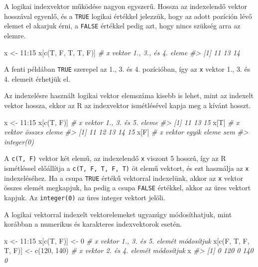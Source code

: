 \documentclass[
]{book}
\newenvironment{Shaded}{\begin{snugshade}}{\end{snugshade}}
\newcommand{\CommentTok}[1]{\textcolor[rgb]{0.56,0.35,0.01}{\textit{#1}}}
\newcommand{\DecValTok}[1]{\textcolor[rgb]{0.00,0.00,0.81}{#1}}
\newcommand{\FunctionTok}[1]{\textcolor[rgb]{0.00,0.00,0.00}{#1}}
\newcommand{\NormalTok}[1]{#1}
\newcommand{\OtherTok}[1]{\textcolor[rgb]{0.56,0.35,0.01}{#1}}
\newcommand{\SpecialCharTok}[1]{\textcolor[rgb]{0.00,0.00,0.00}{#1}}
\begin{document}
A logikai indexvektor működése nagyon egyszerű. Hossza az indexelendő vektor hosszával egyenlő, és a \texttt{TRUE} logikai értékkel jelezzük, hogy az adott pozíción lévő elemet el akarjuk érni, a \texttt{FALSE} értékkel pedig azt, hogy nincs szükség arra az elemre.

\begin{Shaded}
\begin{Highlighting}[]
\NormalTok{x }\OtherTok{\textless{}{-}} \DecValTok{11}\SpecialCharTok{:}\DecValTok{15}
\NormalTok{x[}\FunctionTok{c}\NormalTok{(T, F, T, T, F)]    }\CommentTok{\# x vektor 1., 3., és 4. eleme    }
\CommentTok{\#\textgreater{} [1] 11 13 14}
\end{Highlighting}
\end{Shaded}

A fenti példában \texttt{TRUE} szerepel az 1., 3. és 4. pozícióban, így az \texttt{x} vektor 1., 3. és 4. elemeit érhetjük el.

Az indexelésre használt logikai vektor elemszáma kisebb is lehet, mint az indexelt vektor hossza, ekkor az R az indexvektor ismétlésével kapja meg a kívánt hosszt.

\begin{Shaded}
\begin{Highlighting}[]
\NormalTok{x }\OtherTok{\textless{}{-}} \DecValTok{11}\SpecialCharTok{:}\DecValTok{15}
\NormalTok{x[}\FunctionTok{c}\NormalTok{(T, F)]      }\CommentTok{\# x vektor 1., 3. és 5. eleme}
\CommentTok{\#\textgreater{} [1] 11 13 15}
\NormalTok{x[T]            }\CommentTok{\# x vektor összes eleme}
\CommentTok{\#\textgreater{} [1] 11 12 13 14 15}
\NormalTok{x[F]            }\CommentTok{\# x vektor egyik eleme sem}
\CommentTok{\#\textgreater{} integer(0)}
\end{Highlighting}
\end{Shaded}

A \texttt{c(T,\ F)} vektor két elemű, az indexelendő \texttt{x} viszont 5 hosszú, így az R ismétléssel előállítja a \texttt{c(T,\ F,\ T,\ F,\ T)} öt elemű vektort, és ezt használja az \texttt{x} indexeléséhez. Ha a csupa \texttt{TRUE} értékű vektorral indexelünk, akkor az \texttt{x} vektor összes elemét megkapjuk, ha pedig a csupa \texttt{FALSE} értékkel, akkor az üres vektort kapjuk. Az \texttt{integer(0)} az üres integer vektort jelöli.

A logikai vektorral indexelt vektorelemeket ugyanúgy módosíthatjuk, mint korábban a numerikus és karakteres indexvektorok esetén.

\begin{Shaded}
\begin{Highlighting}[]
\NormalTok{x }\OtherTok{\textless{}{-}} \DecValTok{11}\SpecialCharTok{:}\DecValTok{15}
\NormalTok{x[}\FunctionTok{c}\NormalTok{(T, F)] }\OtherTok{\textless{}{-}} \DecValTok{0}                    \CommentTok{\# x vektor 1., 3. és 5. elemét módosítjuk}
\NormalTok{x[}\FunctionTok{c}\NormalTok{(F, T, F, T, F)] }\OtherTok{\textless{}{-}} \FunctionTok{c}\NormalTok{(}\DecValTok{120}\NormalTok{, }\DecValTok{140}\NormalTok{) }\CommentTok{\# x vektor 2. és 4. elemét módosítjuk}
\NormalTok{x}
\CommentTok{\#\textgreater{} [1]   0 120   0 140   0}
\end{Highlighting}
\end{Shaded}
\end{document}
